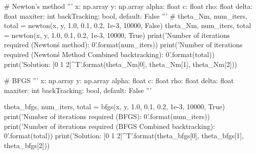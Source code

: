 \documentclass[12pt, a4 paper]{article}
\begin{document}
\begin{python}
# Newton's method
'''
x: np.array
y: np.array
alpha: float
c: float
rho: float
delta: float
maxiter: int
backTracking: bool, default: False
'''
# theta_Nm, num_iters, total = newton(x, y, 1.0, 0.1, 0.2, 1e-3, 10000, False)
theta_Nm, num_iters, total = newton(x, y, 1.0, 0.1, 0.2, 1e-3, 10000, True)
print('Number of iterations required (Newton\'s method): {0}'.format(num_iters))
print('Number of iterations required (Newton\'s Method  Combined backtracking): {0}'.format(total))
print('Solution: [{0} {1} {2}]^T'.format(theta_Nm[0], theta_Nm[1], theta_Nm[2]))

# BFGS
'''
x: np.array
y: np.array
alpha: float
c: float
rho: float
delta: float
maxiter: int
backTracking: bool, default: False
'''

theta_bfgs, num_iters, total = bfgs(x, y, 1.0, 0.1, 0.2, 1e-3, 10000, True)
print('Number of iterations required (BFGS): {0}'.format(num_iters))
print('Number of iterations required (BFGS Combined backtracking): {0}'.format(total))
print('Solution: [{0} {1} {2}]^T'.format(theta_bfgs[0], theta_bfgs[1], theta_bfgs[2]))
        \end{python}
\end{document}

